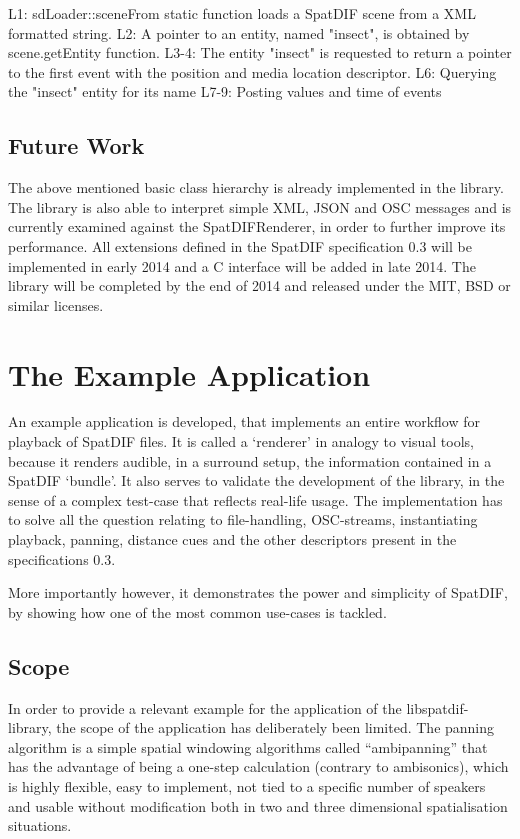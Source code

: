 \documentclass[a4paper]{article}
\begin{document}
L1: sdLoader::sceneFrom static function loads a SpatDIF scene from a XML formatted string. 
L2: A pointer to an entity, named "insect", is obtained by scene.getEntity function.
L3-4: The entity "insect" is requested to return a pointer to the first event with the position and media location descriptor.
L6: Querying the "insect" entity for its name
L7-9: Posting values and time of events 

\subsection{Future Work}

The above mentioned basic class hierarchy is already implemented in the library. The library is also able to interpret simple XML, JSON and OSC messages and is currently examined against  the SpatDIFRenderer, in order to further improve its performance.  All extensions defined in the SpatDIF specification 0.3 will be implemented in early 2014 and a C interface will be added in late 2014. The library will be completed by the end of 2014 and released under the MIT, BSD or similar licenses.

\section{The Example Application}%

An example application is developed, that implements an entire workflow for playback of SpatDIF files. 
It is called a `renderer' in analogy to visual tools, because it renders audible, in a surround setup, the information contained in a SpatDIF `bundle'.
It also serves to validate the development of the library, in the sense of a complex test-case that reflects real-life usage.
The implementation has to solve all the question relating to file-handling, OSC-streams, instantiating playback, panning, distance cues and the other descriptors present in the specifications 0.3.

More importantly however, it demonstrates the power and simplicity of SpatDIF, by showing how one of the most common use-cases is tackled.

\subsection{Scope}

In order to provide a relevant example for the application of the libspatdif-library, the scope of the application has deliberately been limited.
The panning algorithm is a simple spatial windowing algorithms called ``ambipanning'' \cite{Neukom:2008ambipan} that has the advantage of being a one-step calculation (contrary to ambisonics), which is highly flexible, easy to implement, not tied to a specific number of speakers and usable without modification both in two and three dimensional spatialisation situations.
\end{document}
